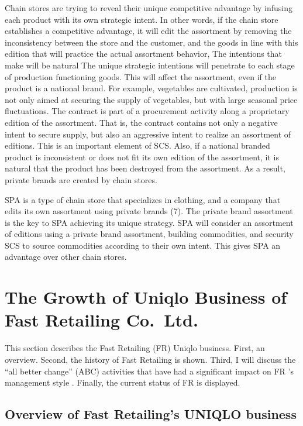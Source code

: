 \documentclass[]{article}
\begin{document}
Chain stores are trying to reveal their unique competitive advantage by
infusing each product with its own strategic intent. In other words, if
the chain store establishes a competitive advantage, it will edit the
assortment by removing the inconsistency between the store and the
customer, and the goods in line with this edition that will practice the
actual assortment behavior, The intentions that make will be natural The
unique strategic intentions will penetrate to each stage of production
functioning goods. This will affect the assortment, even if the product
is a national brand. For example, vegetables are cultivated, production
is not only aimed at securing the supply of vegetables, but with large
seasonal price fluctuations. The contract is part of a procurement
activity along a proprietary edition of the assortment. That is, the
contract contains not only a negative intent to secure supply, but also
an aggressive intent to realize an assortment of editions. This is an
important element of SCS. Also, if a national branded product is
inconsistent or does not fit its own edition of the assortment, it is
natural that the product has been destroyed from the assortment. As a
result, private brands are created by chain stores.

SPA is a type of chain store that specializes in clothing, and a company
that edits its own assortment using private brands (7). The private
brand assortment is the key to SPA achieving its unique strategy. SPA
will consider an assortment of editions using a private brand
assortment, building commodities, and security SCS to source commodities
according to their own intent. This gives SPA an advantage over other
chain stores.

\hypertarget{the-growth-of-uniqlo-business-of-fast-retailing-co.ltd.}{%
\section{The Growth of Uniqlo Business of Fast Retailing
Co.~Ltd.}\label{the-growth-of-uniqlo-business-of-fast-retailing-co.ltd.}}

This section describes the Fast Retailing (FR) Uniqlo business. First,
an overview. Second, the history of Fast Retailing is shown. Third, I
will discuss the ``all better change'' (ABC) activities that have had a
significant impact on FR 's management style . Finally, the current
status of FR is displayed.

\hypertarget{overview-of-fast-retailings-uniqlo-business}{%
\subsection{Overview of Fast Retailing's UNIQLO
business}\label{overview-of-fast-retailings-uniqlo-business}}
\end{document}
